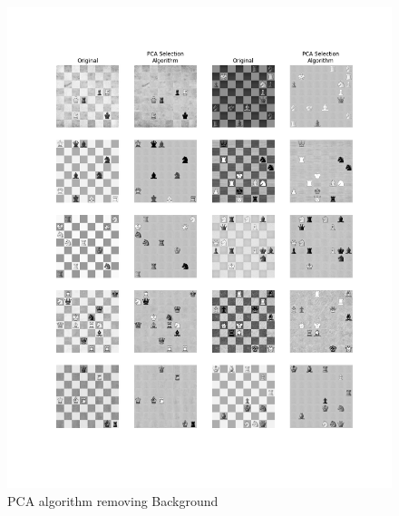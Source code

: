 \documentclass{article}
\begin{document}
\begin{figure}
\centering
\includegraphics[scale=.38]{PCA_Background_remove_alg.png} 
\caption{PCA algorithm removing Background}
\label{fig:PCA_Background}
\end{figure}
\end{document}
